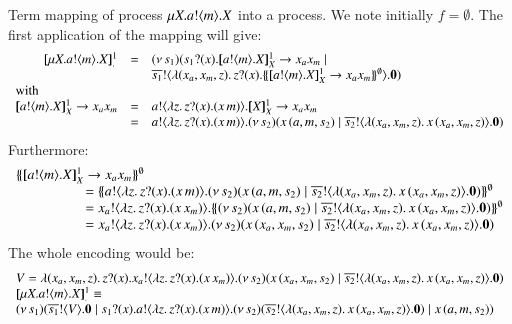 \begin{example}

 Term mapping of \HOp process $\mu X. a ! \langle m \rangle . X$
into a \HO process. We note initially $f = \emptyset$. The first application of the mapping
will give:
%
\[
\begin{array}{rcl}
	\pmapp{\recp{X}{\bout{a}{m} \varp{X}}}{1}{.} &=&
	\newsp{s_1}{ \binp{s_1}{x} \pmapp{\bout{a}{m} \varp{X}}{1}{\varp{X} \rightarrow x_ax_m} \Par\\
	&&\bout{\dual{s_1}}{ \abs{(x_a, x_m, z)} \binp{z}{x} \auxmap{\pmapp{\bout{a}{m} \varp{X}}{1}{\varp{X} \rightarrow x_ax_m}}{\es} } \inact}
	\\
	\multicolumn{3}{l}{\textrm{with}}
	\\
	\pmapp{\bout{a}{m} \varp{X}}{1}{ \varp{X} \rightarrow x_ax_m} &=&
	\bout{a}{\abs{z}{\binp{z}{x} (\appl{x}{m})}} \pmapp{\varp{X}}{1}{\varp{X} \rightarrow x_ax_m}
	\\
	&=& \bout{a}{\abs{z}{\binp{z}{x} (\appl{x}{m})}} \newsp{s_2}{\appl{x}{(a,m, s_2)}  \Par \bout{\dual{s_2}}{\abs{(x_a, x_m, z)}{\appl{x}{(x_a, x_m, z)}}} \inact}
\end{array}
\]
%
\noi Furthermore:
%
\[
\begin{array}{l}
	\auxmap{\pmapp{\bout{a}{m} \varp{X}}{1}{\varp{X} \rightarrow x_ax_m}}{\es}\\
	\qquad \qquad \quad = \auxmap{\bout{a}{\abs{z}{\binp{z}{x} (\appl{x}{m})}} \newsp{s_2}{\appl{x}{(a,m, s_2)}  \Par \bout{\dual{s_2}}{\abs{(x_a, x_m, z)}{\appl{x}{(x_a, x_m, z)}}} \inact}}{\es}
	\\
	\qquad \qquad \quad = \bout{x_a}{\abs{z}{\binp{z}{x} (\appl{x}{x_m})}} \auxmap{\newsp{s_2}{\appl{x}{(a,m, s_2)}  \Par \bout{\dual{s_2}}{\abs{(x_a, x_m, z)}{\appl{x}{(x_a, x_m, z)}}} \inact}}{\es}
	\\
	\qquad \qquad \quad = \bout{x_a}{\abs{z}{\binp{z}{x} (\appl{x}{x_m})}} \newsp{s_2}{\appl{x}{(x_a,x_m, s_2)}  \Par \bout{\dual{s_2}}{\abs{(x_a, x_m, z)}{\appl{x}{(x_a, x_m, z)}}} \inact}
\end{array}
\]
%
\noi The whole encoding would be:
%
\[
\begin{array}{l}
	V = \abs{(x_a, x_m, z)} \binp{z}{x} \bout{x_a}{\abs{z}{\binp{z}{x} (\appl{x}{x_m})}} \newsp{s_2}{\appl{x}{(x_a,x_m, s_2)}  \Par \bout{\dual{s_2}}{\abs{(x_a, x_m, z)}{\appl{x}{(x_a, x_m, z)}}} \inact}\\
	\pmapp{\recp{X}{\bout{a}{m} \varp{X}}}{1}{.} \scong \\
	\newsp{s_1}{\bout{\dual{s_1}}{V} \inact \Par \binp{s_1}{x} \bout{a}{\abs{z}{\binp{z}{x} (\appl{x}{m})}} \newsp{s_2}{\bout{\dual{s_2}}{\abs{(x_a, x_m, z)}{\appl{x}{(x_a, x_m, z)}}} \inact} \Par \appl{x}{(a,m, s_2)}}
\end{array}
\]


\end{example}
